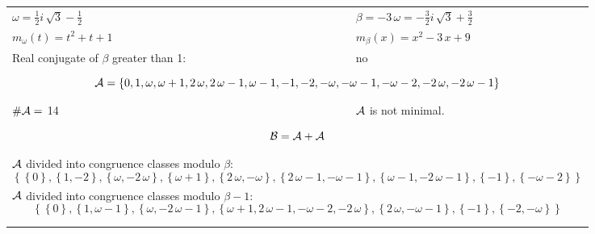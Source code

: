 \begin{exmp}
\label{ex:compareAC}


\rule{0cm}{0cm}

\begin{tabular}{ll}
$\omega=  \frac{1}{2} i \, \sqrt{3} - \frac{1}{2} $  & $\beta= -3 \, \omega = -\frac{3}{2} i \, \sqrt{3} + \frac{3}{2} $\\
$m_\omega(t)=  t^{2} + t + 1 $  & $m_\beta(x)=  x^{2} - 3 \, x + 9 $\\
Real conjugate of $\beta$ greater than 1:   &  no \\ \hline
\multicolumn{2}{l}{\begin{minipage}{\textwidth}\begin{dmath*}\A = \left\{0, 1, \omega, \omega + 1, 2 \, \omega, 2 \, \omega - 1, \omega - 1, -1, -2, -\omega, -\omega - 1, -\omega - 2, -2 \, \omega, -2 \, \omega - 1\right\}  \end{dmath*}\end{minipage} }\\
$\#\mathcal{A}= $ 14 $ $ & $\mathcal{A}$ is not minimal. \\
\multicolumn{2}{l}{\begin{minipage}{\textwidth}\begin{dmath*}\B =\A+\A \end{dmath*}\end{minipage} }\\[10pt]
\multicolumn{2}{l}{\begin{minipage}{\textwidth}$\mathcal{A}$ divided into congruence classes modulo $\beta$: \begin{dmath*} \left\{\left\{0\right\}, \left\{1, -2\right\}, \left\{\omega, -2 \, \omega\right\}, \left\{\omega + 1\right\}, \left\{2 \, \omega, -\omega\right\}, \left\{2 \, \omega - 1, -\omega - 1\right\}, \left\{\omega - 1, -2 \, \omega - 1\right\}, \left\{-1\right\}, \left\{-\omega - 2\right\}\right\}  \end{dmath*}\end{minipage} }\\[10pt]
\multicolumn{2}{l}{\begin{minipage}{\textwidth}$\mathcal{A}$ divided into congruence classes modulo $\beta-1$: \begin{dmath*} \left\{\left\{0\right\}, \left\{1, \omega - 1\right\}, \left\{\omega, -2 \, \omega - 1\right\}, \left\{\omega + 1, 2 \, \omega - 1, -\omega - 2, -2 \, \omega\right\}, \left\{2 \, \omega, -\omega - 1\right\}, \left\{-1\right\}, \left\{-2, -\omega\right\}\right\}  \end{dmath*}\end{minipage} }\\
 & \\ \hline
 & \\
\end{tabular}


\end{exmp}
